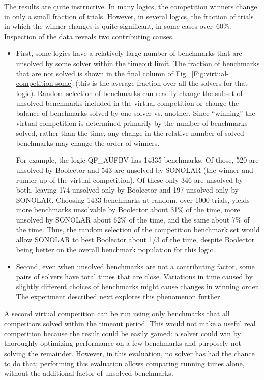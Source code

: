 \documentclass{eptcs}
\begin{document}
The results are quite instructive. In many logics, the competition winners change in only a small fraction of trials.
However, in several logics, the fraction of trials in which the winner changes is quite significant, in some cases over~60\%. Inspection of the data reveals two contributing causes.
\begin{itemize}
\item First, some logics have a relatively large number of benchmarks that are unsolved by some solver within the timeout limit.  The fraction of benchmarks that are not solved is shown in the final column of Fig.~\ref{Fig:virtual-competition-some} (this is the average fraction over all the solvers for that logic). Random selection of benchmarks can readily change the subset of unsolved benchmarks included in the virtual competition or change the balance of benchmarks solved by one solver vs. another. Since ``winning'' the virtual competition is determined primarily by the number of benchmarks solved, rather than the time, any change in the relative number of solved benchmarks may change the order of winners. 

For example, the logic QF\_AUFBV has 14335 benchmarks. Of those, 520 are unsolved by Boolector and 543 are unsolved by SONOLAR (the winner and runner up of the virtual competition). Of these only 346 are unsolved by both, leaving 174 unsolved only by Boolector and 197 unsolved only by SONOLAR. Choosing 1433 benchmarks at random, over 1000 trials, yields more benchmarks unsolvable by Boolector about 31\% of the time, more unsolved by SONOLAR about 62\% of the time, and the same about 7\% of the time. Thus, the random selection of the competition benchmark set would allow SONOLAR to best Boolector about 1/3 of the time, despite Boolector being better on the overall benchmark population for this logic.

\item Second, even when unsolved benchmarks are not a contributing factor, some pairs of solvers have total times that are close. Variations in time caused by slightly different choices of benchmarks might cause changes in winning order. The experiment described next explores this phenomenon further.

\end{itemize}

A second virtual competition can be run using only benchmarks that all competitors solved within the timeout period. This would not make a useful real competition because the result could be easily gamed: a solver could win by thoroughly optimizing performance on a few benchmarks and purposely not solving the remainder. However, in this evaluation, no solver has had the chance to do that; performing this evaluation allows comparing running times alone, without the additional factor of unsolved benchmarks.
\end{document}
